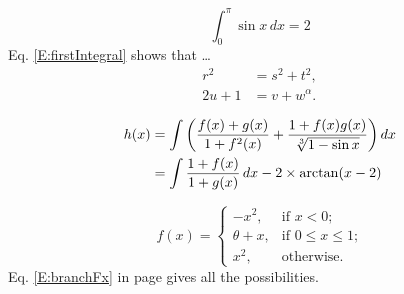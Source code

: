 \documentclass[12pt, a4paper, reqno]{amsart}
\begin{document}
 
    \begin{equation}\label{E:firstIntegral}
        \int_{0}^{\pi} \sin x \, dx = 2
    \end{equation}
    Eq. \eqref{E:firstIntegral} shows that \dots
    \begin{align}
        r^{2} &= s^{2} + t^{2}, \label{E:Pyth}\\
        2u + 1&= v + w^{\alpha}. \label{E:alpha}
    \end{align}
    
    \begin{align}
        h(x) &= \int \left(\frac{f(x) + g(x)}{1 + f^{2}(x)} + 
                \frac{1 + f(x)g(x)}{\sqrt[3]{1 - \sin x}} \right) dx \label{E:longInt}\\
             &= \int \frac{1 + f(x)}{1 + g(x)} \, dx - 2\times\arctan (x-2) \notag
    \end{align}

    \begin{equation} \label{E:branchFx}
        f(x) = 
            \begin{cases}
                -x^{2},     &\text{if $x < 0$;}\\
                \theta + x, &\text{if $0 \leq x \leq 1$;}\\
                x^{2},      &\text{otherwise.}
            \end{cases}
    \end{equation}
    Eq. \eqref{E:branchFx} in page \pageref{E:branchFx} gives all the possibilities.
\end{document}
